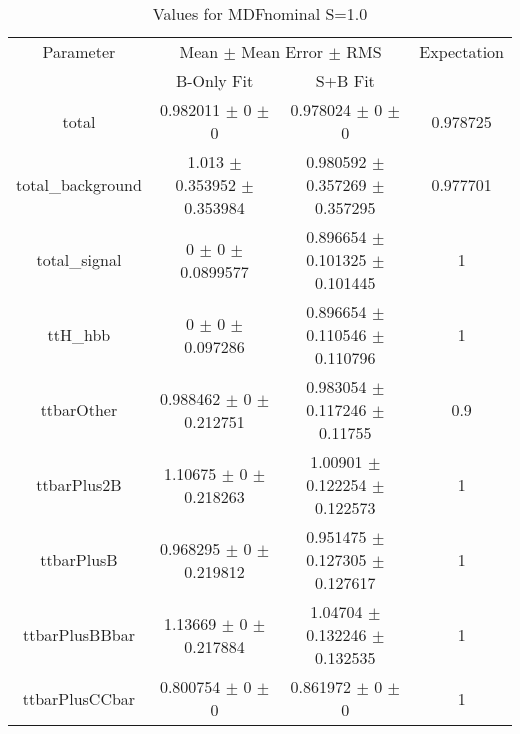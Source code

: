 \begin{table}
\centering
\caption{Values for MDFnominal S=1.0}
\begin{tabular}{cccc}
\toprule
Parameter & \multicolumn{2}{c}{Mean $\pm$ Mean Error $\pm$ RMS} & Expectation\\
 & B-Only Fit & S+B Fit & \\
\midrule
total & \num{0.982011} $\pm$ \num{0} $\pm$ \num{0} & \num{0.978024} $\pm$ \num{0} $\pm$ \num{0} & \num{0.978725}\\
total\_background & \num{1.013} $\pm$ \num{0.353952} $\pm$ \num{0.353984} & \num{0.980592} $\pm$ \num{0.357269} $\pm$ \num{0.357295} & \num{0.977701}\\
total\_signal & \num{0} $\pm$ \num{0} $\pm$ \num{0.0899577} & \num{0.896654} $\pm$ \num{0.101325} $\pm$ \num{0.101445} & \num{1}\\
ttH\_hbb & \num{0} $\pm$ \num{0} $\pm$ \num{0.097286} & \num{0.896654} $\pm$ \num{0.110546} $\pm$ \num{0.110796} & \num{1}\\
ttbarOther & \num{0.988462} $\pm$ \num{0} $\pm$ \num{0.212751} & \num{0.983054} $\pm$ \num{0.117246} $\pm$ \num{0.11755} & \num{0.9}\\
ttbarPlus2B & \num{1.10675} $\pm$ \num{0} $\pm$ \num{0.218263} & \num{1.00901} $\pm$ \num{0.122254} $\pm$ \num{0.122573} & \num{1}\\
ttbarPlusB & \num{0.968295} $\pm$ \num{0} $\pm$ \num{0.219812} & \num{0.951475} $\pm$ \num{0.127305} $\pm$ \num{0.127617} & \num{1}\\
ttbarPlusBBbar & \num{1.13669} $\pm$ \num{0} $\pm$ \num{0.217884} & \num{1.04704} $\pm$ \num{0.132246} $\pm$ \num{0.132535} & \num{1}\\
ttbarPlusCCbar & \num{0.800754} $\pm$ \num{0} $\pm$ \num{0} & \num{0.861972} $\pm$ \num{0} $\pm$ \num{0} & \num{1}\\
\bottomrule
\end{tabular}
\end{table}